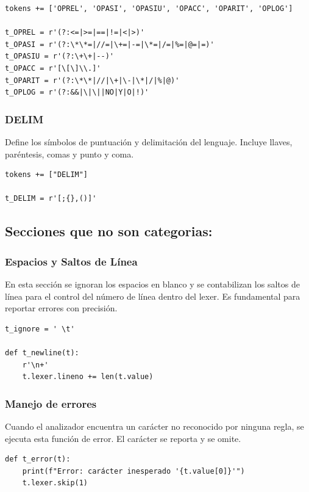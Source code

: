 \documentclass{article}
\begin{document}
\begin{lstlisting}[style=mypython]
tokens += ['OPREL', 'OPASI', 'OPASIU', 'OPACC', 'OPARIT', 'OPLOG']

t_OPREL = r'(?:<=|>=|==|!=|<|>)'
t_OPASI = r'(?:\*\*=|//=|\+=|-=|\*=|/=|%=|@=|=)'
t_OPASIU = r'(?:\+\+|--)'
t_OPACC = r'[\[\]\\.]'
t_OPARIT = r'(?:\*\*|//|\+|\-|\*|/|%|@)'
t_OPLOG = r'(?:&&|\|\||NO|Y|O|!)'
\end{lstlisting}

\subsubsection{DELIM}

Define los símbolos de puntuación y delimitación del lenguaje. Incluye llaves, paréntesis, comas y punto y coma.

\begin{lstlisting}[style=mypython]
tokens += ["DELIM"]

t_DELIM = r'[;{},()]'
\end{lstlisting}

\subsection{Secciones que no son categorias:}

\subsubsection{Espacios y Saltos de Línea}

En esta sección se ignoran los espacios en blanco y se contabilizan los saltos de línea para el control del número de línea dentro del lexer. Es fundamental para reportar errores con precisión.

\begin{lstlisting}[style=mypython]
t_ignore = ' \t'

def t_newline(t):
    r'\n+'
    t.lexer.lineno += len(t.value)
\end{lstlisting}

\subsubsection{Manejo de errores}
Cuando el analizador encuentra un carácter no reconocido por ninguna regla, se ejecuta esta función de error. El carácter se reporta y se omite.

\begin{lstlisting}[style=mypython]
def t_error(t):
    print(f"Error: carácter inesperado '{t.value[0]}'")
    t.lexer.skip(1)
\end{lstlisting}
\end{document}
